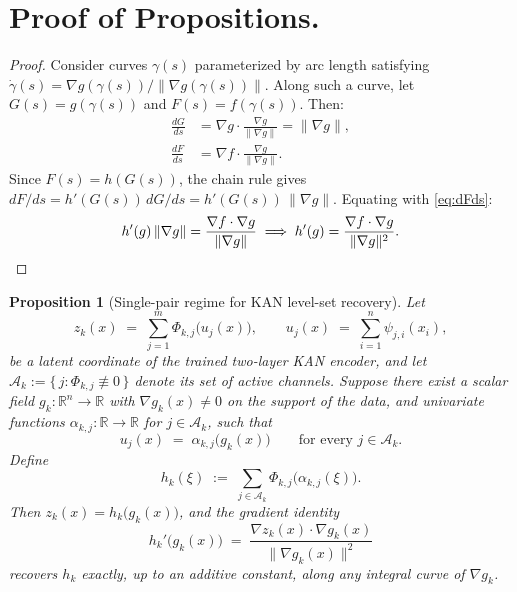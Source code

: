 \documentclass{article}
\newtheorem{proposition}{Proposition}
\begin{document}
\newpage
\section{Proof of Propositions.}
\label{app:proof-hprime}



\begin{proof}
Consider curves $\gamma(s)$ parameterized by arc length satisfying
$\dot{\gamma}(s) = \nabla g(\gamma(s)) / \|\nabla g(\gamma(s))\|$.
Along such a curve, let $G(s) = g(\gamma(s))$ and $F(s) = f(\gamma(s))$.
Then:
\begin{align}
  \frac{dG}{ds} &= \nabla g \cdot \frac{\nabla g}{\|\nabla g\|}
    = \|\nabla g\|, \label{eq:dGds} \\
  \frac{dF}{ds} &= \nabla f \cdot \frac{\nabla g}{\|\nabla g\|}.
    \label{eq:dFds}
\end{align}
Since $F(s) = h(G(s))$, the chain rule gives
$dF/ds = h'(G(s))\,dG/ds = h'(G(s))\,\|\nabla g\|$.
Equating with \eqref{eq:dFds}:
\begin{equation}
  h'(g)\,\|\nabla g\| = \frac{\nabla f \cdot \nabla g}{\|\nabla g\|}
  \implies
  h'(g) = \frac{\nabla f \cdot \nabla g}{\|\nabla g\|^2}.
  \qedhere
\end{equation}
\end{proof}

\begin{proposition}[Single-pair regime for KAN level-set recovery]
\label{prop:single-pair}
Let
$$
  z_k(x) \;=\; \sum_{j=1}^m \Phi_{k,j}\bigl(u_j(x)\bigr),
  \qquad
  u_j(x) \;=\; \sum_{i=1}^n \psi_{j,i}(x_i),
$$
be a latent coordinate of the trained two-layer KAN encoder, and let
$\mathcal{A}_k := \{\, j : \Phi_{k,j} \not\equiv 0 \,\}$ denote its set of
active channels. Suppose there exist a scalar field
$g_k : \mathbb{R}^n \to \mathbb{R}$ with $\nabla g_k(x) \neq 0$ on the
support of the data, and univariate functions
$\alpha_{k,j} : \mathbb{R} \to \mathbb{R}$ for $j \in \mathcal{A}_k$,
such that
\begin{equation}
\label{eq:co-foliation}
  u_j(x) \;=\; \alpha_{k,j}\bigl(g_k(x)\bigr)
  \qquad \text{for every } j \in \mathcal{A}_k.
\end{equation}
Define
$$
  h_k(\xi) \;:=\; \sum_{j \in \mathcal{A}_k}
    \Phi_{k,j}\bigl(\alpha_{k,j}(\xi)\bigr).
$$
Then $z_k(x) = h_k\bigl(g_k(x)\bigr)$, and the gradient identity
\begin{equation}
\label{eq:grad-identity}
  h_k'\bigl(g_k(x)\bigr)
  \;=\;
  \frac{\nabla z_k(x) \cdot \nabla g_k(x)}{\|\nabla g_k(x)\|^2}
\end{equation}
recovers $h_k$ exactly, up to an additive constant, along any integral
curve of $\nabla g_k$.
\end{proposition}
\end{document}
